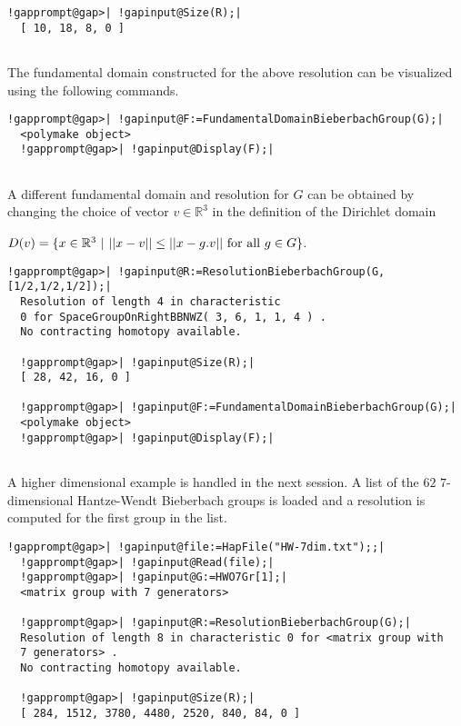 \documentclass[a4paper,11pt]{report}
\begin{document}
{{\begin{Verbatim}[commandchars=!@|,fontsize=\small,frame=single,label=Example]
  !gapprompt@gap>| !gapinput@Size(R);|
  [ 10, 18, 8, 0 ]
  
\end{Verbatim}
 The fundamental domain constructed for the above resolution can be visualized
using the following commands. 
\begin{Verbatim}[commandchars=!@|,fontsize=\small,frame=single,label=Example]
  !gapprompt@gap>| !gapinput@F:=FundamentalDomainBieberbachGroup(G);|
  <polymake object>
  !gapprompt@gap>| !gapinput@Display(F);|
  
\end{Verbatim}
 

  

 A different fundamental domain and resolution for $G$ can be obtained by changing the choice of vector $v\in \mathbb R^3$ in the definition of the Dirichlet domain 

$D(v) = \{x\in \mathbb R^3\ | \ ||x-v|| \le ||x-g.v||\ {\rm for~all~} g\in G\}$. 
\begin{Verbatim}[commandchars=!@|,fontsize=\small,frame=single,label=Example]
  !gapprompt@gap>| !gapinput@R:=ResolutionBieberbachGroup(G,[1/2,1/2,1/2]);|
  Resolution of length 4 in characteristic 
  0 for SpaceGroupOnRightBBNWZ( 3, 6, 1, 1, 4 ) . 
  No contracting homotopy available. 
  
  !gapprompt@gap>| !gapinput@Size(R);|
  [ 28, 42, 16, 0 ]
  
  !gapprompt@gap>| !gapinput@F:=FundamentalDomainBieberbachGroup(G);|
  <polymake object>
  !gapprompt@gap>| !gapinput@Display(F);|
  
\end{Verbatim}
 

  

 A higher dimensional example is handled in the next session. A list of the $62$ $7$-dimensional Hantze-Wendt Bieberbach groups is loaded and a resolution is
computed for the first group in the list. 
\begin{Verbatim}[commandchars=!@|,fontsize=\small,frame=single,label=Example]
  !gapprompt@gap>| !gapinput@file:=HapFile("HW-7dim.txt");;|
  !gapprompt@gap>| !gapinput@Read(file);|
  !gapprompt@gap>| !gapinput@G:=HWO7Gr[1];|
  <matrix group with 7 generators>
  
  !gapprompt@gap>| !gapinput@R:=ResolutionBieberbachGroup(G);|
  Resolution of length 8 in characteristic 0 for <matrix group with 
  7 generators> . 
  No contracting homotopy available.
  
  !gapprompt@gap>| !gapinput@Size(R);|
  [ 284, 1512, 3780, 4480, 2520, 840, 84, 0 ]
  

\end{Verbatim}}}
\end{document}
